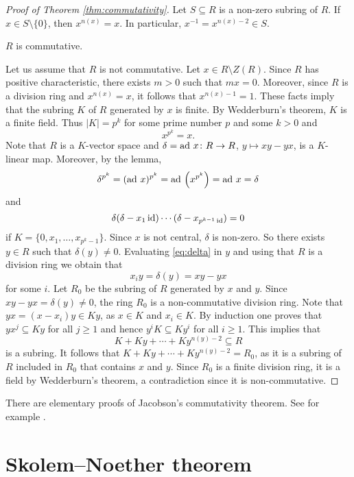 \begin{proof}[Proof of Theorem \ref{thm:commutativity}]
    Let $S\subseteq R$ is a non-zero subring of $R$. If $x\in S\setminus\{0\}$, 
    then 
    $x^{n(x)}=x$. In particular, $x^{-1}=x^{n(x)-2}\in S$.
    
    \begin{claim}
        $R$ is commutative.
    \end{claim}
    
    Let us assume that $R$ is not commutative. Let $x\in R\setminus Z(R)$. 
    Since $R$ has positive characteristic, there exists $m>0$ such that 
    $mx=0$. Moreover, since $R$ is a division ring and 
    $x^{n(x)}=x$, it follows that $x^{n(x)-1}=1$. These facts imply that
    the subring $K$ of $R$ generated by
    $x$ is finite. By Wedderburn's theorem, $K$ is 
    a finite field. 
    Thus 
    $|K|=p^k$ for some prime number $p$ and some $k>0$ and 
    \[
    x^{p^k}=x.
    \]
    Note that $R$ is a $K$-vector space
    and $\delta=\operatorname{ad}\,x\colon R\to R$, $y\mapsto xy-yx$, is a $K$-linear map. Moreover, 
    by the lemma, 
    \[
    \delta^{p^k}=(\operatorname{ad}\,x)^{p^k}=\operatorname{ad}\,\left(x^{p^k}\right)=\operatorname{ad}\,x=\delta
    \]
    and 
    \begin{equation}
        \label{eq:delta}
        \delta(\delta-x_1\operatorname{id})\cdots (\delta-x_{p^{k-1}\operatorname{id}})=0
    \end{equation}
    if $K=\{0,x_1,\dots,x_{p^k-1}\}$. Since $x$ is not central, 
    $\delta$ is non-zero. So there exists $y\in R$ such that $\delta(y)\ne 0$. 
    Evaluating \eqref{eq:delta} in $y$ and using that $R$ is a division ring 
    we obtain that 
    \[
    x_iy=\delta(y)=xy-yx
    \]
    for some $i$. Let $R_0$ be the subring of $R$ generated by $x$ and $y$. 
    Since $xy-yx=\delta(y)\ne 0$, the ring $R_0$ is a 
    non-commutative division ring. Note that 
    $yx=(x-x_i)y\in Ky$, as $x\in K$ and $x_i\in K$. By induction one proves
    that $yx^j\subseteq Ky$ for all $j\geq 1$ and hence
    $y^iK\subseteq Ky^i$ for
    all $i\geq1$. This implies that
    \[
    K+Ky+\cdots+Ky^{n(y)-2}\subseteq R
    \]
    is a subring. It follows that $K+Ky+\cdots+Ky^{n(y)-2}=R_0$, 
    as it is a subring of $R$ included in $R_0$ 
    that contains $x$ and $y$. Since 
    $R_0$ is a finite division ring, it is a field 
    by Wedderburn's theorem, a contradiction since
    it is non-commutative.
\end{proof}

There are elementary proofs of Jacobson's commutativity theorem.
See for example \cite{MR347890}. 

\section{Skolem--Noether theorem}

